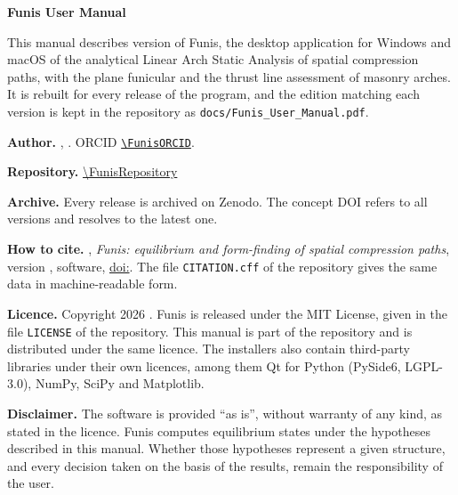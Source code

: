 \documentclass[fontsize=10.5pt,paper=a4,parskip=half,headings=normal,numbers=noenddot,
  open=any,bibliography=totoc,captions=tableheading]{scrreprt}
\numberwithin{figure}{chapter}
\numberwithin{table}{chapter}
\newcommand{\file}[1]{\texttt{#1}}
\begin{document}
\thispagestyle{empty}
\vspace*{\fill}
{\small\sloppy
\noindent\textsf{\bfseries\color{ink} Funis \FunisVersion{} User Manual}\\
\ManualDate

\medskip
\noindent This manual describes version \FunisVersion{} of Funis, the desktop application for Windows and macOS
of the analytical Linear Arch Static Analysis of spatial compression paths, with the plane funicular and
the thrust line assessment of masonry arches. It is rebuilt for every release of the program, and the
edition matching each version is kept in the repository as \file{docs/Funis\_User\_Manual.pdf}.

\medskip
\noindent\textsf{\bfseries\color{ink} Author.} \FunisAuthor, \FunisAffiliation.
ORCID \href{\FunisORCID}{\nolinkurl{\FunisORCID}}.

\noindent\textsf{\bfseries\color{ink} Repository.} \url{\FunisRepository}

\noindent\textsf{\bfseries\color{ink} Archive.} Every release is archived on Zenodo. The concept DOI
\href{https://doi.org/\FunisDOI}{\FunisDOI} refers to all versions and resolves to the latest one.

\noindent\textsf{\bfseries\color{ink} How to cite.} \FunisAuthor, \emph{Funis: equilibrium and
form-finding of spatial compression paths}, version \FunisVersion, software,
\href{https://doi.org/\FunisDOI}{doi:\FunisDOI}. The file \file{CITATION.cff} of the repository gives the
same data in machine-readable form.

\medskip
\noindent\textsf{\bfseries\color{ink} Licence.} Copyright \textcopyright{} 2026 \FunisAuthor. Funis is
released under the MIT License, given in the file \file{LICENSE} of the repository. This manual is part
of the repository and is distributed under the same licence. The installers also contain third-party
libraries under their own licences, among them Qt for Python (PySide6, LGPL-3.0), NumPy, SciPy and
Matplotlib.

\medskip
\noindent\textsf{\bfseries\color{ink} Disclaimer.} The software is provided ``as is'', without warranty
of any kind, as stated in the licence. Funis computes equilibrium states under the hypotheses described
in this manual. Whether those hypotheses represent a given structure, and every decision taken on the
basis of the results, remain the responsibility of the user.
}
\clearpage

\setcounter{tocdepth}{1}
\tableofcontents
\end{document}
